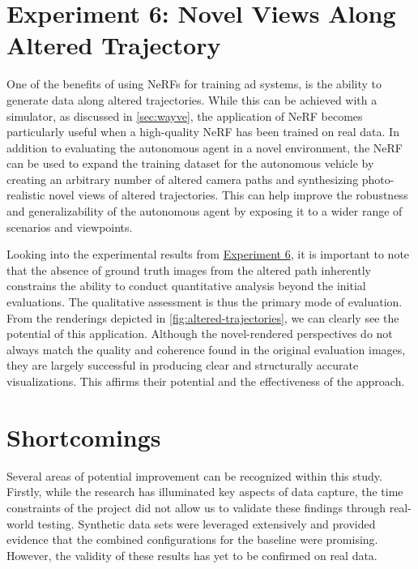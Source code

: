 \begin{comment}
- The estimation could be further improved by investigating techniques for leveraging more of the contained data.
- The NAPLab car's accelerometer could be used to calculate roll and pitch.
- LiDAR data could be used for further pose estimation
\end{comment}





\section{Experiment 6: Novel Views Along Altered Trajectory}
One of the benefits of using NeRFs for training \acrshort{ad} systems, is the ability to generate data along altered trajectories. While this can be achieved with a simulator, as discussed in \autoref{sec:wayve}, the application of NeRF becomes particularly useful when a high-quality NeRF has been trained on real data. In addition to evaluating the autonomous agent in a novel environment, the NeRF can be used to expand the training dataset for the autonomous vehicle by creating an arbitrary number of altered camera paths and synthesizing photo-realistic novel views of altered trajectories. This can help improve the robustness and generalizability of the autonomous agent by exposing it to a wider range of scenarios and viewpoints.

Looking into the experimental results from \hyperref[sec:altered-trajectories]{Experiment 6}, it is important to note that the absence of ground truth images from the altered path inherently constrains the ability to conduct quantitative analysis beyond the initial evaluations. The qualitative assessment is thus the primary mode of evaluation. From the renderings depicted in \autoref{fig:altered-trajectories}, we can clearly see the potential of this application. Although the novel-rendered perspectives do not always match the quality and coherence found in the original evaluation images, they are largely successful in producing clear and structurally accurate visualizations. This affirms their potential and the effectiveness of the approach.



\section{Shortcomings}
Several areas of potential improvement can be recognized within this study. Firstly, while the research has illuminated key aspects of data capture, the time constraints of the project did not allow us to validate these findings through real-world testing. Synthetic data sets were leveraged extensively and provided evidence that the combined configurations for the baseline were promising. However, the validity of these results has yet to be confirmed on real data.

